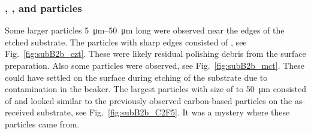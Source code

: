 \subsubsection{, , and  particles}
Some larger particles \SIrange{5}{50}{\micro\metre} long were observed near the edges of the etched substrate. The particles with sharp edges consisted of , see Fig.~\ref{fig:subB2b_czt}. These were likely residual polishing debris from the surface preparation. Also some  particles were observed, see Fig.~\ref{fig:subB2b_mct}. These could have settled on the surface during etching of the substrate due to contamination in the beaker. The largest particles with size of to \SI{50}{\micro\metre} consisted of  and looked similar to the previously observed carbon-based particles on the as-received substrate, see Fig.~\ref{fig:subB2b_C2F5}. It was a mystery where these particles came from.

\begin{comment}
\todo{Fiks dette et sted.}
In order to observe correlations between the occurrence of voids and microvoids on the as-received substrate B to the occurrence of polishing grit after polish and etch, the sample Pearson correlation coefficient was determined. \todo{Skriv inn formel. Og regn ut correlation.} If there are one dataset $x_i \in \{x_1, ..., x_n\}$ containing $n$ values and another dataset $y_i \in \{y_1, ..., y_n\}$ containing $n$ values, then the sample Pearson correlation coefficient is defined as

\begin{equation}\label{eq:pearson_correlation_coefficient}
    r = \frac{
        n\sum_{i=1}^nx_iy_i - \sum_{i=1}^n x_i \sum_{i=1}^n y_i
        }{
        \sqrt{n\sum_{i=1}^n x_i^2 - \parentheses{\sum_{i=1}^n x_i}^2}\sqrt{n\sum_{i=1}^n y_i^2 - \parentheses{\sum_{i=1}^n y_i}^2} },
\end{equation}
where $\avg{x}=\frac{1}{n}\sum_{i=1}^n x_i$ is the sample mean; and analogously for $\avg{y}$. 

%
\end{comment}

